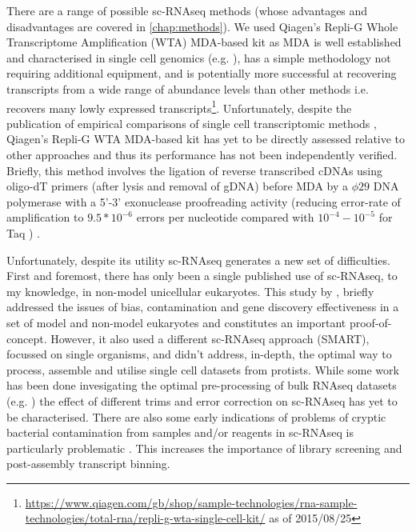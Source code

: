 There are a range of possible sc-RNAseq methods (whose advantages and disadvantages are covered in \ref{chap:methods}).
We used Qiagen's Repli-G Whole Transcriptome Amplification (WTA) MDA-based kit as MDA 
is well established and characterised in single cell genomics (e.g. \citep{Spits2006}), 
has a simple methodology not requiring additional equipment, and is potentially more successful at
recovering transcripts from a wide range of abundance levels than other methods i.e. recovers many lowly expressed transcripts\footnote{
\url{https://www.qiagen.com/gb/shop/sample-technologies/rna-sample-technologies/total-rna/repli-g-wta-single-cell-kit/} as of 2015/08/25}.
Unfortunately, despite the publication of empirical comparisons of single cell transcriptomic methods \citep{Wu2014a}, 
Qiagen's Repli-G WTA MDA-based kit has yet to be directly assessed relative to other approaches and thus its performance has not
been independently verified. 
Briefly, this method involves the ligation of reverse transcribed cDNAs using oligo-dT primers (after lysis and 
removal of gDNA) before MDA by a \(\phi29\) DNA polymerase with a 5'-3' exonuclease proofreading activity 
(reducing error-rate of amplification to \(9.5*10^{-6}\) errors per nucleotide \citep{Paez2004} compared with
\(10^{-4}-10^{-5}\) for Taq \citep{Tindall1988,Eckert1990}) \citep{Korfhage2015}.



Unfortunately, despite its utility sc-RNAseq generates a new set of difficulties.
First and foremost, there has only been a single published use of sc-RNAseq, to my knowledge, in non-model unicellular eukaryotes.   
This study by \citep{Kolisko2014}, briefly addressed the issues of bias, contamination and gene discovery effectiveness in a set of model and non-model eukaryotes and
constitutes an important proof-of-concept.  
However, it also used a different sc-RNAseq approach (SMART), focussed on single organisms, 
and didn't address, in-depth, the optimal way to process, assemble and utilise single cell datasets from protists.
While some work has been done invesigating the optimal pre-processing of bulk RNAseq datasets (e.g. \citep{Macmanes2013,Macmanes2015}) 
the effect of different trims and error correction on sc-RNAseq has yet to be characterised.  
There are also some early indications of problems of cryptic bacterial contamination
from samples and/or reagents in sc-RNAseq is particularly problematic \citep{Kolisko2014}. 
This increases the importance of library screening and post-assembly transcript binning.



